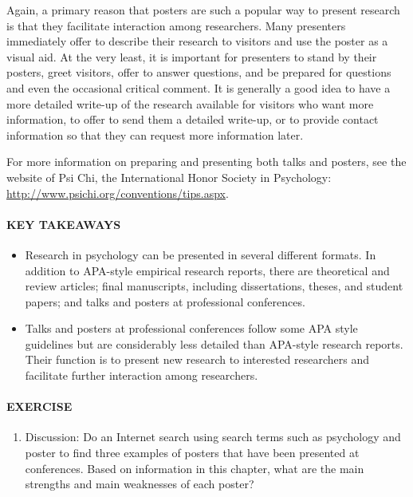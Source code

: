 \documentclass[
]{krantz}
\providecommand{\tightlist}{%
  \setlength{\itemsep}{0pt}\setlength{\parskip}{0pt}}
\begin{document}
Again, a primary reason that posters are such a popular way to present research is that they facilitate interaction among researchers. Many presenters immediately offer to describe their research to visitors and use the poster as a visual aid. At the very least, it is important for presenters to stand by their posters, greet visitors, offer to answer questions, and be prepared for questions and even the occasional critical comment. It is generally a good idea to have a more detailed write-up of the research available for visitors who want more information, to offer to send them a detailed write-up, or to provide contact information so that they can request more information later.

For more information on preparing and presenting both talks and posters, see the website of Psi Chi, the International Honor Society in Psychology: \url{http://www.psichi.org/conventions/tips.aspx}.

\hypertarget{key-takeaways-33}{%
\paragraph*{KEY TAKEAWAYS}\label{key-takeaways-33}}

\begin{itemize}
\tightlist
\item
  Research in psychology can be presented in several different formats. In addition to APA-style empirical research reports, there are theoretical and review articles; final manuscripts, including dissertations, theses, and student papers; and talks and posters at professional conferences.
\item
  Talks and posters at professional conferences follow some APA style guidelines but are considerably less detailed than APA-style research reports. Their function is to present new research to interested researchers and facilitate further interaction among researchers.
\end{itemize}

\hypertarget{exercise-6}{%
\paragraph*{EXERCISE}\label{exercise-6}}

\begin{enumerate}
\def\labelenumi{\arabic{enumi}.}
\tightlist
\item
  Discussion: Do an Internet search using search terms such as psychology and poster to find three examples of posters that have been presented at conferences. Based on information in this chapter, what are the main strengths and main weaknesses of each poster?
\end{enumerate}
\end{document}
